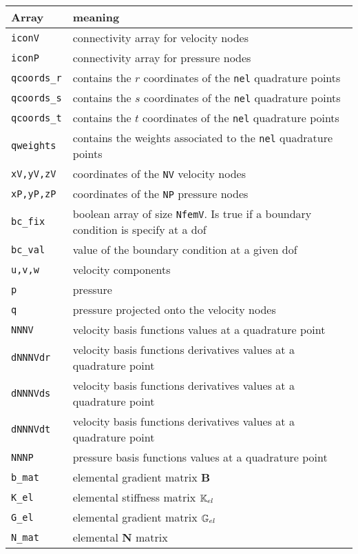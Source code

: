 \vspace{.5cm}

\begin{tabular}{p{3.5cm}p{12.5cm}}
\hline
Array & meaning \\
\hline
\hline
{\tt iconV} & connectivity array for velocity nodes \\
{\tt iconP} & connectivity array for pressure nodes \\
{\tt qcoords\_r} & contains the $r$ coordinates of the {\tt nel} quadrature points \\
{\tt qcoords\_s} & contains the $s$ coordinates of the {\tt nel} quadrature points \\
{\tt qcoords\_t} & contains the $t$ coordinates of the {\tt nel} quadrature points \\
{\tt qweights} & contains the weights associated to the {\tt nel} quadrature points \\
{\tt xV,yV,zV} & coordinates of the {\tt NV} velocity nodes \\
{\tt xP,yP,zP} & coordinates of the {\tt NP} pressure nodes \\
{\tt bc\_fix} & boolean array of size {\tt NfemV}. Is true if a boundary condition
                is specify at a dof \\
{\tt bc\_val} & value of the boundary condition at a given dof \\
{\tt u,v,w} & velocity components \\ 
{\tt p} & pressure \\ 
{\tt q} & pressure projected onto the velocity nodes\\
{\tt NNNV} & velocity basis functions values at a quadrature point \\
{\tt dNNNVdr} & velocity basis functions derivatives values at a quadrature point \\
{\tt dNNNVds} & velocity basis functions derivatives values at a quadrature point \\
{\tt dNNNVdt} & velocity basis functions derivatives values at a quadrature point \\
{\tt NNNP} & pressure basis functions values at a quadrature point \\
{\tt b\_mat} & elemental gradient matrix ${\bm B}$ \\
{\tt K\_el}  & elemental stiffness matrix ${\mathbb{K}}_{el}$ \\
{\tt G\_el}  & elemental gradient matrix ${\mathbb{G}}_{el}$ \\
{\tt N\_mat}  & elemental ${\bm N}$ matrix \\

\end{tabular}
